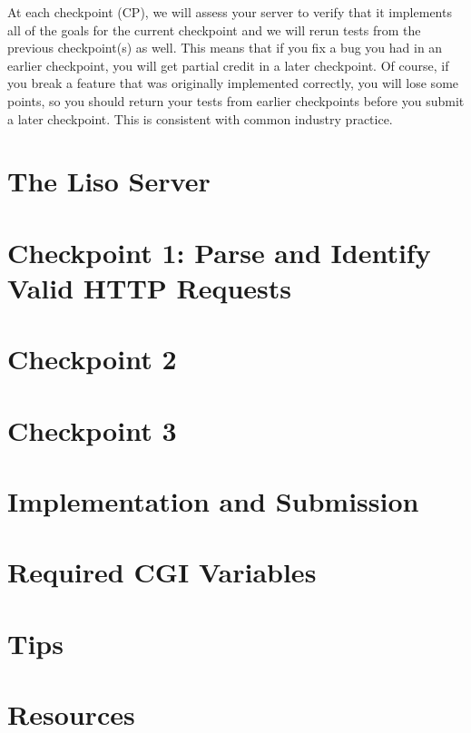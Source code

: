 \documentclass{article}
\begin{document}
\noindent At each checkpoint (CP), we will assess your server to verify that it implements all of the goals for the current checkpoint 
and we will rerun tests from the previous checkpoint(s) as well. 
This means that if you fix a bug you had in an earlier checkpoint, you will get partial credit in a later checkpoint.  Of course, if you 
break a feature that was originally implemented correctly, you will lose some points, so you should return your tests from earlier 
checkpoints before you submit a later checkpoint.  This is consistent with common industry practice.

\newpage
\section{The Liso Server}


\newpage
\section{Checkpoint 1: Parse and Identify Valid HTTP Requests}


\newpage
\section{Checkpoint 2}


\newpage
\section{Checkpoint 3}


\newpage
\section{Implementation and Submission}
\label{sec:impl}


\appendix

\newpage
\section{Required CGI Variables}


\newpage
\section{Tips}


\newpage
\section{Resources}


\newpage

\end{document}
